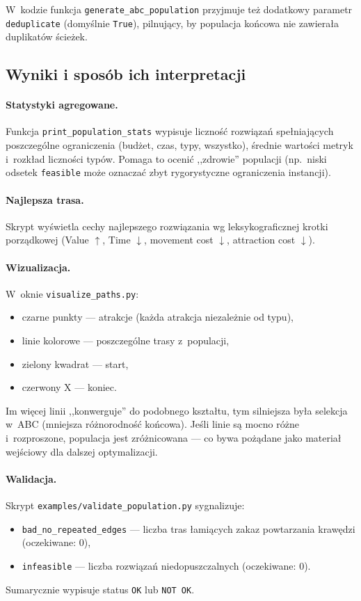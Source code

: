 W~kodzie funkcja \texttt{generate\_abc\_population} przyjmuje też dodatkowy
parametr \texttt{deduplicate} (domyślnie \texttt{True}), pilnujący, by
populacja końcowa nie zawierała duplikatów ścieżek.

\subsection{Wyniki i sposób ich interpretacji}

\paragraph{Statystyki agregowane.} Funkcja
\texttt{print\_population\_stats} wypisuje liczność rozwiązań spełniających
poszczególne ograniczenia (budżet, czas, typy, wszystko), średnie wartości
metryk i~rozkład liczności typów. Pomaga to ocenić ,,zdrowie'' populacji
(np.\ niski odsetek \texttt{feasible} może oznaczać zbyt rygorystyczne
ograniczenia instancji).

\paragraph{Najlepsza trasa.} Skrypt wyświetla cechy najlepszego rozwiązania
wg leksykograficznej krotki porządkowej (Value $\uparrow$, Time $\downarrow$,
movement cost $\downarrow$, attraction cost $\downarrow$).

\paragraph{Wizualizacja.} W~oknie \texttt{visualize\_paths.py}:
\begin{itemize}
    \item czarne punkty --- atrakcje (każda atrakcja niezależnie od typu),
    \item linie kolorowe --- poszczególne trasy z~populacji,
    \item zielony kwadrat --- start,
    \item czerwony X --- koniec.
\end{itemize}

Im więcej linii ,,konwerguje'' do podobnego kształtu, tym silniejsza była
selekcja w~ABC (mniejsza różnorodność końcowa). Jeśli linie są mocno
różne i~rozproszone, populacja jest zróżnicowana --- co bywa pożądane jako
materiał wejściowy dla dalszej optymalizacji.

\paragraph{Walidacja.}
Skrypt \texttt{examples/validate\_population.py} sygnalizuje:
\begin{itemize}
    \item \texttt{bad\_no\_repeated\_edges} --- liczba tras łamiących zakaz
          powtarzania krawędzi (oczekiwane: 0),
    \item \texttt{infeasible} --- liczba rozwiązań niedopuszczalnych
          (oczekiwane: 0).
\end{itemize}
Sumarycznie wypisuje status \texttt{OK} lub \texttt{NOT OK}.
